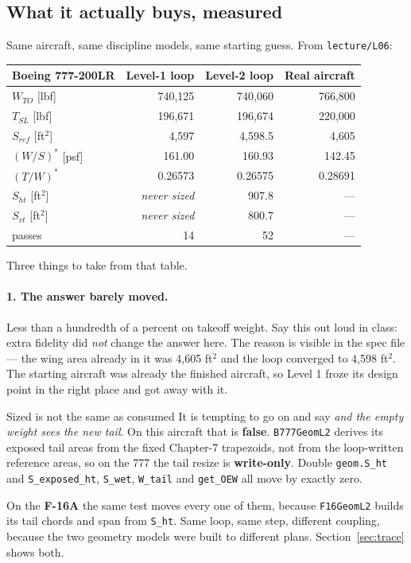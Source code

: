 \documentclass[11pt, a4paper]{article}
\begin{document}
\subsection{What it actually buys, measured}

Same aircraft, same discipline models, same starting guess. From
\texttt{lecture/L06}:

\begin{center}
\footnotesize
\begin{tabular}{@{}lrrr@{}}
\toprule
Boeing 777-200LR & \textbf{Level-1 loop} & \textbf{Level-2 loop} & Real aircraft \\
\midrule
$W_{TO}$ [lbf]     & 740{,}125 & 740{,}060 & 766{,}800 \\
$T_{SL}$ [lbf]     & 196{,}671 & 196{,}674 & 220{,}000 \\
$S_{ref}$ [ft$^2$] & 4{,}597   & 4{,}598.5 & 4{,}605 \\
$(W/S)^*$ [psf]    & 161.00    & 160.93    & 142.45 \\
$(T/W)^*$          & 0.26573   & 0.26575   & 0.28691 \\
$S_{ht}$ [ft$^2$]  & \emph{never sized} & 907.8 & --- \\
$S_{vt}$ [ft$^2$]  & \emph{never sized} & 800.7 & --- \\
passes             & 14        & 52        & --- \\
\bottomrule
\end{tabular}
\end{center}

Three things to take from that table.

\paragraph{1. The answer barely moved.} Less than a hundredth of a percent on
takeoff weight. Say this out loud in class: extra fidelity did \emph{not} change
the answer here. The reason is visible in the spec file --- the wing area
already in it was 4{,}605 ft$^2$ and the loop converged to 4{,}598 ft$^2$. The
starting aircraft was already the finished aircraft, so Level 1 froze its design
point in the right place and got away with it.

\begin{warnbox}{Sized is not the same as consumed}
It is tempting to go on and say \emph{and the empty weight sees the new tail}.
On this aircraft that is \textbf{false}. \texttt{B777GeomL2} derives its exposed
tail areas from the fixed Chapter-7 trapezoids, not from the loop-written
reference areas, so on the 777 the tail resize is \textbf{write-only}. Double
\texttt{geom.S\_ht} and \texttt{S\_exposed\_ht}, \texttt{S\_wet},
\texttt{W\_tail} and \texttt{get\_OEW} all move by exactly zero.

On the \textbf{F-16A} the same test moves every one of them, because
\texttt{F16GeomL2} builds its tail chords and span from \texttt{S\_ht}. Same
loop, same step, different coupling, because the two geometry models were
built to different plans. Section~\ref{sec:trace} shows both.
\end{warnbox}
\end{document}
